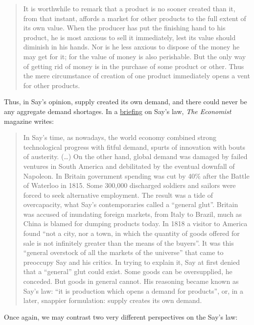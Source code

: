\documentclass[]{book}
\begin{document}
\begin{quote}
It is worthwhile to remark that a product is no sooner created than it,
from that instant, affords a market for other products to the full
extent of its own value. When the producer has put the finishing hand to
his product, he is most anxious to sell it immediately, lest its value
should diminish in his hands. Nor is he less anxious to dispose of the
money he may get for it; for the value of money is also perishable. But
the only way of getting rid of money is in the purchase of some product
or other. Thus the mere circumstance of creation of one product
immediately opens a vent for other products.
\end{quote}

Thus, in Say's opinion, supply created its own demand, and there could
never be any aggregate demand shortages. In a
\href{https://www.economist.com/economics-brief/2017/08/10/says-law-supply-creates-its-own-demand}{briefing}
on Say's law, \emph{The Economist} magazine writes:

\begin{quote}
In Say's time, as nowadays, the world economy combined strong
technological progress with fitful demand, spurts of innovation with
bouts of austerity. (\ldots{}) On the other hand, global demand was
damaged by failed ventures in South America and debilitated by the
eventual downfall of Napoleon. In Britain government spending was cut by
40\% after the Battle of Waterloo in 1815. Some 300,000 discharged
soldiers and sailors were forced to seek alternative employment. The
result was a tide of overcapacity, what Say's contemporaries called a
``general glut''. Britain was accused of inundating foreign markets,
from Italy to Brazil, much as China is blamed for dumping products
today. In 1818 a visitor to America found ``not a city, nor a town, in
which the quantity of goods offered for sale is not infinitely greater
than the means of the buyers''. It was this ``general overstock of all
the markets of the universe'' that came to preoccupy Say and his
critics. In trying to explain it, Say at first denied that a ``general''
glut could exist. Some goods can be oversupplied, he conceded. But goods
in general cannot. His reasoning became known as Say's law: ``it is
production which opens a demand for products'', or, in a later, snappier
formulation: supply creates its own demand.
\end{quote}

Once again, we may contrast two very different perspectives on the Say's
law:
\end{document}
